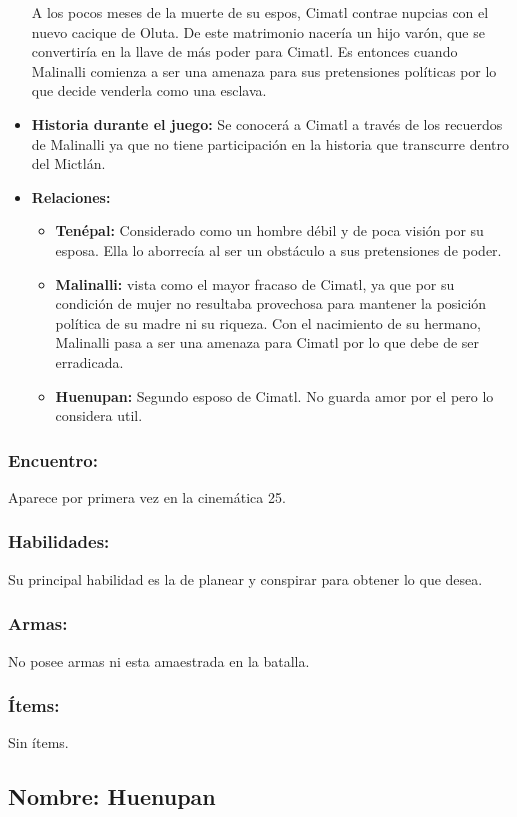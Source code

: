 \documentclass[11pt,letterpaper]{article}
\begin{document}
\begin{itemize}
	A los pocos meses de la muerte de su espos, Cimatl contrae nupcias con el nuevo cacique de Oluta. De este matrimonio nacería un hijo varón, que se convertiría en la llave de más poder para Cimatl. Es entonces cuando Malinalli comienza a ser una amenaza para sus pretensiones políticas por lo que decide venderla como una esclava.  
	\item \textbf{Historia durante el juego:}
	Se conocerá a Cimatl a través de los recuerdos de Malinalli ya que no tiene participación en la historia que transcurre dentro del Mictlán.
	\item \textbf{Relaciones:}
	\begin{itemize}
		\item \textbf{Tenépal:} Considerado como un hombre débil y de poca visión por su esposa. Ella lo aborrecía al ser un obstáculo a sus pretensiones de poder. 
		\item \textbf{Malinalli:} vista como el mayor fracaso de Cimatl, ya que por su condición de mujer no resultaba provechosa para mantener la posición política de su madre ni su riqueza. Con el nacimiento de su hermano, Malinalli pasa a ser una amenaza para Cimatl por lo que debe de ser erradicada.
		\item \textbf{Huenupan:} Segundo esposo de Cimatl. No guarda amor por el pero lo considera util.
	\end{itemize}                     
\end{itemize}

\subsubsection{Encuentro:}
Aparece por primera vez en la cinemática 25.
\subsubsection{Habilidades:}
Su principal habilidad es la de planear y conspirar para obtener lo que desea.
\subsubsection{Armas:}
No posee armas ni esta amaestrada en la batalla.
\subsubsection{Ítems:}
Sin ítems.


\subsection{Nombre: Huenupan}  \label{per.huenupan}
\end{document}
